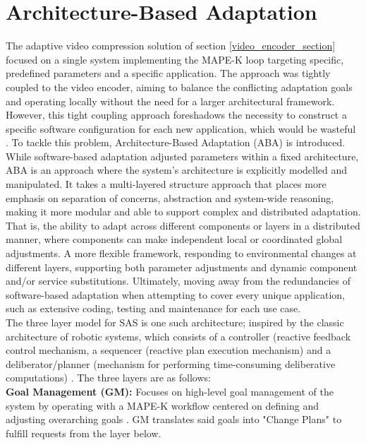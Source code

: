 \documentclass[conference]{IEEEtran}
\begin{document}
\section{\textbf{Architecture-Based Adaptation}}
The adaptive video compression solution of section \ref{video_encoder_section} focused on a single system implementing the MAPE-K loop targeting specific, predefined parameters and a specific application. The approach was tightly coupled to the video encoder, aiming to balance the conflicting adaptation goals and operating locally without the need for a larger architectural framework. However, this tight coupling approach foreshadows the necessity to construct a specific software configuration for each new application, which would be wasteful \cite{lecture5_pdf}. To tackle this problem, Architecture-Based Adaptation (ABA) is introduced. While software-based adaptation adjusted parameters within a fixed architecture, ABA is an approach where the system's architecture is explicitly modelled and manipulated. It takes a multi-layered structure approach that places more emphasis on separation of concerns, abstraction and system-wide reasoning, making it more modular and able to support complex and distributed adaptation. That is, the ability to adapt across different components or layers in a distributed manner, where components can make independent local or coordinated global adjustments. A more flexible framework, responding to environmental changes at different layers, supporting both parameter adjustments and dynamic component and/or service substitutions.  Ultimately, moving away from the redundancies of software-based adaptation when attempting to cover every unique application, such as extensive coding, testing and maintenance for each use case.\\

The three layer model for SAS is one such architecture; inspired by the classic architecture of robotic systems, which consists of a controller (reactive feedback control mechanism, a sequencer (reactive plan execution mechanism) and a deliberator/planner (mechanism for performing time-consuming deliberative computations) \cite{lecture5_pdf}. The three layers are as follows:\\

\noindent \textbf{Goal Management (GM):} Focuses on high-level goal management of the system by operating with a MAPE-K workflow centered on defining and adjusting overarching goals \cite{lecture5_pdf}. GM translates said goals into "Change Plans" to fulfill requests from the layer below.\\
\end{document}
